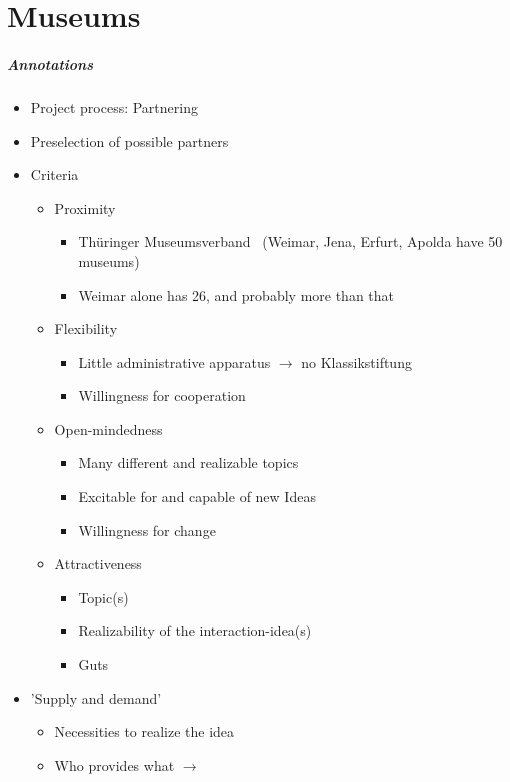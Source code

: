 \chapter{Museums}
\label{museums}

\paragraph{Annotations}

\begin{itemize}
	\item Project process: Partnering
	\\
	\item Preselection of possible partners
	\item Criteria
	\begin{itemize}
		\item Proximity
		\begin{itemize}
			\item Thüringer Museumsverband~\cite{ThueringerMuseumsverbandOrte} (Weimar, Jena, Erfurt, Apolda have 50 museums)
			\item Weimar alone has 26, and probably more than that
		\end{itemize}
		\item Flexibility
		\begin{itemize}
			\item Little administrative apparatus $\to$ no Klassikstiftung
			\item Willingness for cooperation
		\end{itemize}
		\item Open-mindedness
		\begin{itemize}
			\item Many different and realizable topics
			\item Excitable for and capable of new Ideas
			\item Willingness for change
		\end{itemize}
		\item Attractiveness
		\begin{itemize}
			\item Topic(s)
			\item Realizability of the interaction-idea(s)
			\item Guts
		\end{itemize}
	\end{itemize}
	\item 'Supply and demand'
	\begin{itemize}
		\item Necessities to realize the idea
		\item Who provides what $\to$
	\end{itemize}
\end{itemize}

